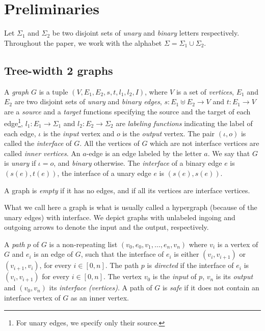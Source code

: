 \section{Preliminaries}\label{sec:prelim}

 Let $\Sigma_1$ and $\Sigma_2$ be two disjoint sets of \emph{unary} and \emph{binary} letters respectively. Throughout the paper, we work with the alphabet $\Sigma=\Sigma_1\cup \Sigma_2$. 
\subsection{Tree-width 2 graphs}
\begin{definition}[Graphs] 
 A \emph{graph} $G$ is  a tuple $(V,E_1,E_2, s, t, l_1, l_2, I)$, where $V$ is a set of \emph{vertices}, $E_1$ and $E_2$ are two disjoint sets  of \emph{unary} and \emph{binary edges}, $s:E_1\uplus E_2\to V$  and $t:E_1\to V$ are a \emph{source} and a \emph{target} functions specifying the source and the target of each edge\footnote{For unary edges, we specify only their source.}, $l_1:E_1\to \Sigma_1$ and $l_2:E_2\to \Sigma_2$ are \emph{labeling functions}  indicating the label of each edge,  $\iota$ is the  \emph{input} vertex and $o$ is the \emph{output} vertex. The pair $(\iota, o)$ is called the \emph{interface} of $G$. All the vertices of $G$ which are not interface vertices are called \emph{inner vertices}. An $a$-edge is an edge labeled by the letter $a$. We say that $G$ is \emph{unary} if $\iota=o$, and \emph{binary} otherwise. The \emph{interface} of a binary edge $e$ is $(s(e),t(e))$, the interface of a unary edge $e$ is $(s(e),s(e))$.
 
  A  graph is \emph{empty} if it has no edges, and if all its vertices are interface vertices.  
 \end{definition}
   \begin{remark} What we call here a graph is what is usually called a hypergraph (because of the unary edges) with interface.  We depict graphs  with unlabeled ingoing and outgoing arrows to denote the input and the output, respectively. 
   \end{remark}
   \begin{definition}[Paths]
   A \emph{path} $p$ of $G$ is a non-repeating list $(v_0,e_0,v_1,\dots,e_n,v_n)$ where $v_i$ is a vertex of $G$ and $e_i$ is an edge of $G$, such that the interface of $e_i$ is either $(v_i, v_{i+1})$ or $(v_{i+1},v_i)$, for every $i\in[0,n]$. The path $p$ is \emph{directed} if the interface of $e_i$ is  $(v_i, v_{i+1})$ for every $i\in[0,n]$. The vertex $v_0$ is the \emph{input} of $p$, $v_n$  is its \emph{output} and $(v_0,v_n)$ its \emph{interface (vertices)}. 
   A path of $G$ is \emph{safe} if it does not contain an interface vertex of $G$ as an inner vertex. 
   \end{definition} 
